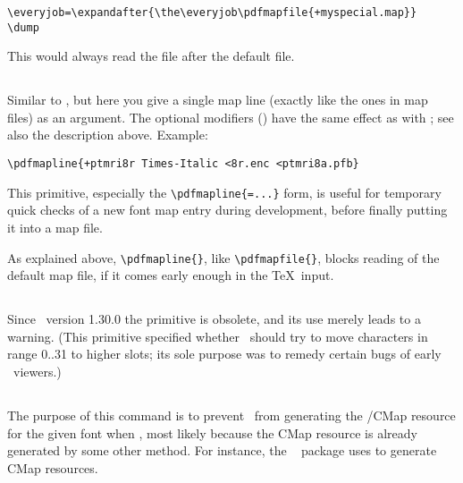 \documentclass{pdftexmanual}
\begin{document}
\begin{verbatim}
\everyjob=\expandafter{\the\everyjob\pdfmapfile{+myspecial.map}}
\dump
\end{verbatim}

This would always read the file  after the default
 file.

\subsection{}

Similar to , but here you give a single map line (exactly
like the ones in map files) as an argument. The optional modifiers
(\type{+-=}) have the same effect as with ; see also the
description above. Example:

\begin{verbatim}
\pdfmapline{+ptmri8r Times-Italic <8r.enc <ptmri8a.pfb}
\end{verbatim}

This primitive, especially the \verb|\pdfmapline{=...}| form, is useful
for temporary quick checks of a new font map entry during development,
before finally putting it into a map file.

As explained above, \verb|\pdfmapline{}|, like \verb|\pdfmapfile{}|,
blocks reading of the default map file, if it comes early enough in the
\TeX\ input. 

\subsection{}

Since \PDFTEX\ version 1.30.0 the primitive  is
obsolete, and its use merely leads to a warning. (This primitive
specified whether \PDFTEX\ should try to move characters in range 0..31
to higher slots; its sole purpose was to remedy certain bugs of early
\PDF\ viewers.)

\subsection{}

The purpose of this command is to prevent \PDFTEX\ from generating the
/CMap resource for the given font when
, most likely because the CMap resource is already
generated by some other method. For instance, the \LATEX\ 
package uses  to generate CMap resources.
\end{document}
